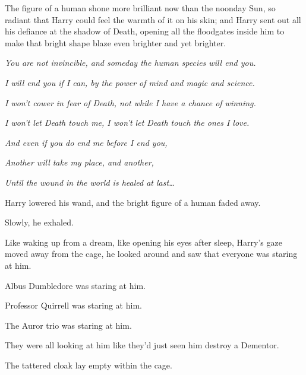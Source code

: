 The figure of a human shone more brilliant now than the noonday Sun, so
radiant that Harry could feel the warmth of it on his skin; and Harry
sent out all his defiance at the shadow of Death, opening all the
floodgates inside him to make that bright shape blaze even brighter and
yet brighter.

\emph{You are not invincible, and someday the human species will end
you.}

\emph{I will end you if I can, by the power of mind and magic and
science.}

\emph{I won't cower in fear of Death, not while I have a chance of
winning.}

\emph{I won't let Death touch me, I won't let Death touch the ones I
love.}

\emph{And even if you do end me before I end you,}

\emph{Another will take my place, and another,}

\emph{Until the wound in the world is healed at last\ldots{}}

Harry lowered his wand, and the bright figure of a human faded away.

Slowly, he exhaled.

Like waking up from a dream, like opening his eyes after sleep, Harry's
gaze moved away from the cage, he looked around and saw that everyone
was staring at him.

Albus Dumbledore was staring at him.

Professor Quirrell was staring at him.

The Auror trio was staring at him.

They were all looking at him like they'd just seen him destroy a
Dementor.

The tattered cloak lay empty within the cage.
